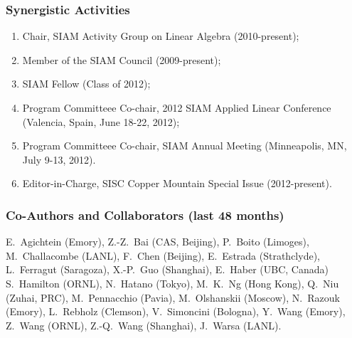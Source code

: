
\vspace*{-3ex}
\subsubsection*{Synergistic Activities}
\vspace{-1ex}
%
\begin{enumerate}
  \parskip = -2pt
\item Chair, SIAM Activity Group on Linear Algebra (2010-present); 
\item Member of the SIAM Council (2009-present);
\item SIAM Fellow (Class of 2012); 
\item Program Committeee Co-chair, 2012 SIAM Applied Linear Conference
  (Valencia, Spain, June 18-22, 2012);
\item Program Committeee Co-chair, SIAM Annual Meeting (Minneapolis, MN, July
  9-13, 2012).
\item Editor-in-Charge, SISC Copper Mountain Special Issue (2012-present).
\end{enumerate}


\vspace*{-3ex}
\subsubsection*{Co-Authors and Collaborators (last 48 months)}
\vspace{-1ex}

{\parindent 0.2in \narrower 
E.~Agichtein (Emory), Z.-Z.~Bai (CAS, Beijing), 
P.~Boito (Limoges), M.~Challacombe (LANL), F.~Chen (Beijing),
E.~Estrada (Strathclyde), L.~Ferragut (Saragoza), 
X.-P.~Guo (Shanghai), E.~Haber (UBC, Canada)
S.~Hamilton (ORNL), N.~Hatano (Tokyo), M.~K.~Ng (Hong Kong), 
Q.~Niu (Zuhai, PRC), M.~Pennacchio (Pavia), M.~Olshanskii (Moscow), 
N.~Razouk (Emory), L.~Rebholz (Clemson), V.~Simoncini 
(Bologna), Y.~Wang (Emory), Z.~Wang (ORNL), Z.-Q.~Wang (Shanghai),
J.~Warsa (LANL).
}

